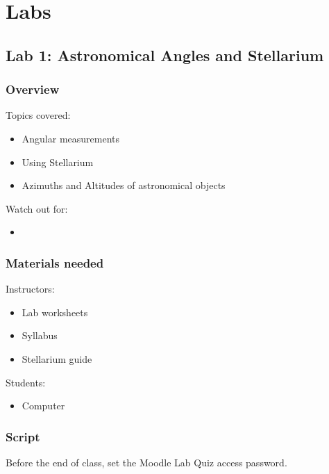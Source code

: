 \documentclass[12pt]{article}
\begin{document}
\newpage
\section{Labs}

\subsection{Lab 1: Astronomical Angles and Stellarium}

\subsubsection{Overview}

Topics covered:
\begin{itemize}
\item Angular measurements
\item Using Stellarium
\item Azimuths and Altitudes of astronomical objects
\end{itemize}

\noindent
Watch out for:
\begin{itemize}
\item 
\end{itemize}

\subsubsection{Materials needed}

Instructors:
\begin{itemize}
\item Lab worksheets
\item Syllabus
\item Stellarium guide
\end{itemize}

\noindent
Students:
\begin{itemize}
\item Computer
\end{itemize}


\subsubsection{Script}

Before the end of class, set the Moodle Lab Quiz access password.
\end{document}
